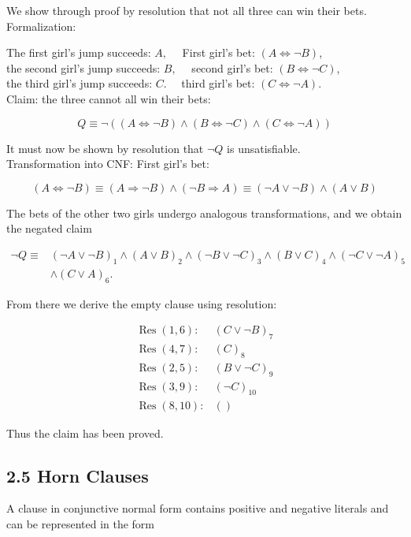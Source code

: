 \documentclass[10pt]{article}
\begin{document}
We show through proof by resolution that not all three can win their bets.\\
Formalization:

The first girl's jump succeeds: $A, \quad$ First girl's bet: $(A \Leftrightarrow \neg B)$,\\
the second girl's jump succeeds: $B, \quad$ second girl's bet: $(B \Leftrightarrow \neg C)$,\\
the third girl's jump succeeds: $C . \quad$ third girl's bet: $(C \Leftrightarrow \neg A)$.\\
Claim: the three cannot all win their bets:

$$
Q \equiv \neg((A \Leftrightarrow \neg B) \wedge(B \Leftrightarrow \neg C) \wedge(C \Leftrightarrow \neg A))
$$

It must now be shown by resolution that $\neg Q$ is unsatisfiable.\\
Transformation into CNF: First girl's bet:

$$
(A \Leftrightarrow \neg B) \equiv(A \Rightarrow \neg B) \wedge(\neg B \Rightarrow A) \equiv(\neg A \vee \neg B) \wedge(A \vee B)
$$

The bets of the other two girls undergo analogous transformations, and we obtain the negated claim

$$
\begin{aligned}
\neg Q \equiv & (\neg A \vee \neg B)_{1} \wedge(A \vee B)_{2} \wedge(\neg B \vee \neg C)_{3} \wedge(B \vee C)_{4} \wedge(\neg C \vee \neg A)_{5} \\
& \wedge(C \vee A)_{6} .
\end{aligned}
$$

From there we derive the empty clause using resolution:

$$
\begin{array}{ll}
\operatorname{Res}(1,6): & (C \vee \neg B)_{7} \\
\operatorname{Res}(4,7): & (C)_{8} \\
\operatorname{Res}(2,5): & (B \vee \neg C)_{9} \\
\operatorname{Res}(3,9): & (\neg C)_{10} \\
\operatorname{Res}(8,10): & ()
\end{array}
$$

Thus the claim has been proved.

\subsection*{2.5 Horn Clauses}
A clause in conjunctive normal form contains positive and negative literals and can be represented in the form
\end{document}
